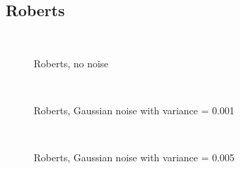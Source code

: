 \documentclass[10pt,a4paper]{article}
\begin{document}
\subsection{Roberts}
\begin{figure}
  \centering
     \\
  \caption{Roberts, no noise}
  \label{fig:robert_no_noise}
\end{figure}

\begin{figure}
  \centering
     \\
  \caption{Roberts, Gaussian noise with variance = 0.001}
  \label{fig:robert_001}
\end{figure}

\begin{figure}
  \centering
     \\
  \caption{Roberts, Gaussian noise with variance = 0.005}
  \label{fig:robert_005}
\end{figure}
\end{document}
